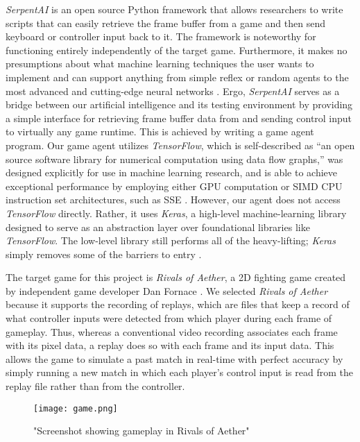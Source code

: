 {\it SerpentAI} is an open source Python framework that allows researchers to write scripts that can easily retrieve the frame buffer from a game and then send keyboard or controller input back to it. The framework is noteworthy for functioning entirely independently of the target game. Furthermore, it makes no presumptions about what machine learning techniques the user wants to implement and can support anything from simple reflex or random agents to the most advanced and cutting-edge neural networks \cite{SerpentAI}. Ergo, {\it SerpentAI} serves as a bridge between our artificial intelligence and its testing environment by providing a simple interface for retrieving frame buffer data from and sending control input to virtually any game runtime. This is achieved by writing a game agent program. Our game agent utilizes {\it TensorFlow}, which is self-described as ``an open source software library for numerical computation using data flow graphs,'' was designed explicitly for use in machine learning research, and is able to achieve exceptional performance by employing either GPU computation or SIMD CPU instruction set architectures, such as SSE \cite{TensorFlow}. However, our agent does not access {\it TensorFlow} directly. Rather, it uses {\it Keras}, a high-level machine-learning library designed to serve as an abstraction layer over foundational libraries like {\it TensorFlow}. The low-level library still performs all of the heavy-lifting; {\it Keras} simply removes some of the barriers to entry \cite{Keras}.

The target game for this project is {\it Rivals of Aether}, a 2D fighting game created by independent game developer Dan Fornace \cite{RivalsofAether}. We selected {\it Rivals of Aether} because it supports the recording of replays, which are files that keep a record of what controller inputs were detected from which player during each frame of gameplay. Thus, whereas a conventional video recording associates each frame with its pixel data, a replay does so with each frame and its input data. This allows the game to simulate a past match in real-time with perfect accuracy by simply running a new match in which each player's control input is read from the replay file rather than from the controller.

\begin{figure}
	\caption{"Screenshot showing gameplay in Rivals of Aether"}
	\centering
	\texttt{[image: game.png]} \\
\end{figure}

